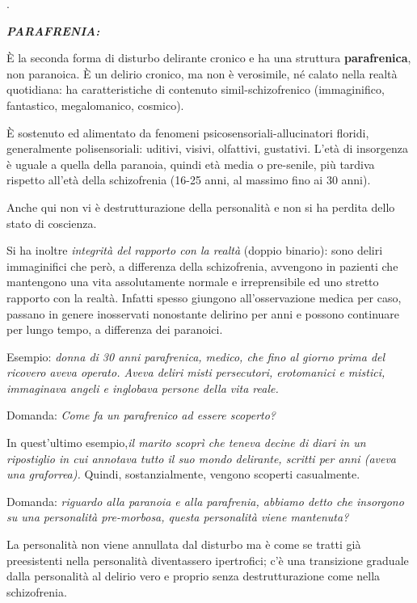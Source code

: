 \documentclass[]{article}
\begin{document}
.

\textbf{\emph{PARAFRENIA: }}

È la seconda forma di disturbo delirante cronico e ha una struttura
\textbf{parafrenica}, non paranoica. È un delirio cronico, ma non è
verosimile, né calato nella realtà quotidiana: ha caratteristiche di
contenuto simil-schizofrenico (immaginifico, fantastico, megalomanico,
cosmico).

È sostenuto ed alimentato da fenomeni psicosensoriali-allucinatori
floridi, generalmente polisensoriali: uditivi, visivi, olfattivi,
gustativi. L'età di insorgenza è uguale a quella della paranoia, quindi
età media o pre-senile, più tardiva rispetto all'età della schizofrenia
(16-25 anni, al massimo fino ai 30 anni).

Anche qui non vi è destrutturazione della personalità e non si ha
perdita dello stato di coscienza.

Si ha inoltre \emph{integrità del rapporto con la realtà} (doppio
binario): sono deliri immaginifici che però, a differenza della
schizofrenia, avvengono in pazienti che mantengono una vita
assolutamente normale e irreprensibile ed uno stretto rapporto con la
realtà. Infatti spesso giungono all'osservazione medica per caso,
passano in genere inosservati nonostante delirino per anni e possono
continuare per lungo tempo, a differenza dei paranoici.

Esempio: \emph{donna di 30 anni parafrenica, medico, che fino al giorno
prima del ricovero aveva operato. Aveva deliri misti persecutori,
erotomanici e mistici, immaginava angeli e inglobava persone della vita
reale. }

Domanda: \emph{Come fa un parafrenico ad essere scoperto?}

In quest'ultimo esempio,\emph{il marito scoprì che teneva decine di
diari in un ripostiglio in cui annotava tutto il suo mondo delirante,
scritti per anni (aveva una graforrea).} Quindi, sostanzialmente,
vengono scoperti casualmente.

Domanda: \emph{riguardo alla paranoia e alla parafrenia, abbiamo detto
che insorgono su una personalità pre-morbosa, questa personalità viene
mantenuta?}

La personalità non viene annullata dal disturbo ma è come se tratti già
preesistenti nella personalità diventassero ipertrofici; c'è una
transizione graduale dalla personalità al delirio vero e proprio senza
destrutturazione come nella schizofrenia.
\end{document}
